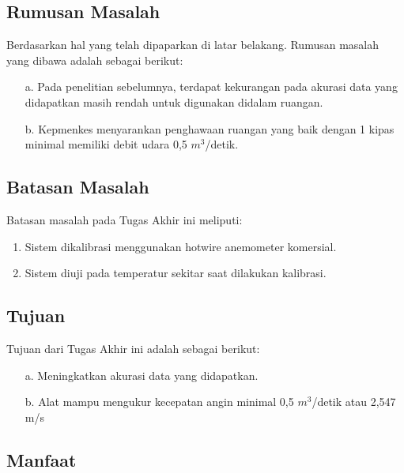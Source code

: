 \subsection{Rumusan Masalah}

Berdasarkan hal yang telah dipaparkan di latar belakang. Rumusan masalah yang dibawa adalah sebagai berikut:
\begin{enumerate}
	\item[a.] Pada penelitian sebelumnya, terdapat kekurangan pada akurasi data yang didapatkan masih rendah untuk digunakan didalam ruangan.
	\item[b.] Kepmenkes menyarankan penghawaan ruangan yang baik dengan 1 kipas minimal memiliki debit udara 0,5 $m^3$/detik.
\end{enumerate}


\subsection{Batasan Masalah}

Batasan masalah pada Tugas Akhir ini meliputi:
\begin{enumerate}
	\item Sistem dikalibrasi menggunakan hotwire anemometer komersial.
	\item Sistem diuji pada temperatur sekitar saat dilakukan kalibrasi.
\end{enumerate}

\subsection{Tujuan}

Tujuan dari Tugas Akhir ini adalah sebagai berikut:
\begin{enumerate}
	\item[a.]	Meningkatkan akurasi data yang didapatkan.
	\item[b.]	Alat mampu mengukur kecepatan angin minimal 0,5 $m^3$/detik atau 2,547 m/s
\end{enumerate}

\subsection{Manfaat}

